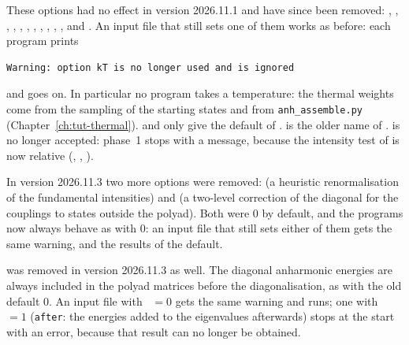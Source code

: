 These options had no effect in version 2026.11.1 and have since been
removed: , , ,
, , ,
, , ,
, ,  and
. An input file that still sets one of them works
as before: each program prints
\begin{lstlisting}
Warning: option kT is no longer used and is ignored
\end{lstlisting}
and goes on. In particular no program takes a temperature: the thermal
weights come from the sampling of the starting states and from
\texttt{anh\_assemble.py} (Chapter~\ref{ch:tut-thermal}).  and
 only give the default of .
 is the older name of .
 is no longer accepted: phase~1 stops with a
message, because the intensity test of  is now relative
(, , ).

In version 2026.11.3 two more options were removed:
 (a heuristic renormalisation of the fundamental
intensities) and  (a two-level correction of the
diagonal for the couplings to states outside the polyad). Both were 0 by
default, and the programs now always behave as with 0: an input file
that still sets either of them gets the same warning, and the results of
the default.

 was removed in version 2026.11.3 as well. The
diagonal anharmonic energies are always included in the polyad matrices
before the diagonalisation, as with the old default 0. An input file
with ~$=0$ gets the same warning and runs; one with
~$=1$ (\texttt{after}: the energies added to the
eigenvalues afterwards) stops at the start with an error, because that
result can no longer be obtained.
